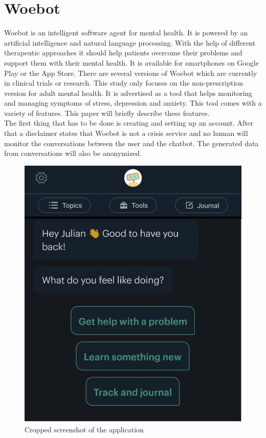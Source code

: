 \section{Woebot}
Woebot is an intelligent software agent for mental health. It is powered by an artificial intelligence and natural language processing. With the help of different therapeutic approaches it should help patients overcome their problems and support them with their mental health. It is available for smartphones on Google Play or the App Store\cite{woebot-download}. There are several versions of Woebot which are currently in clinical trials or research. This study only focuses on the non-prescription version for adult mental health. It is advertised as a tool that helps monitoring and managing symptoms of stress, depression and anxiety\cite{woebot-organizations}. This tool comes with a variety of features. This paper will briefly describe these features. \\


The first thing that has to be done is creating and setting up an account. After that a disclaimer states that Woebot is not a crisis service and no human will monitor the conversations between the user and the chatbot. The generated data from conversations will also be anonymized. \\

\begin{figure}[ht]
\begin{center}
\includegraphics[width=1\columnwidth]{files/fullview.png}
  \caption{\label{fig:fullview} Cropped screenshot of the application}
\end{center}
\end{figure}

